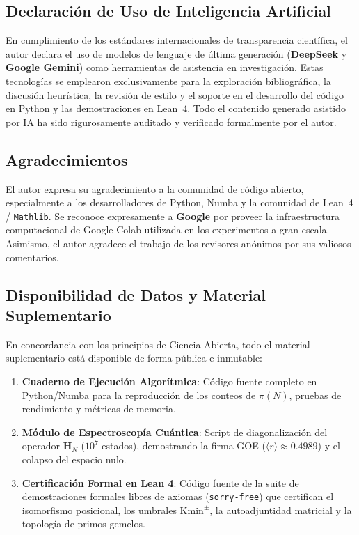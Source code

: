 \documentclass{article}
\numberwithin{equation}{section}
\theoremstyle{plain}
\theoremstyle{definition}
\begin{document}
\subsection*{Declaración de Uso de Inteligencia Artificial}
En cumplimiento de los estándares internacionales de transparencia científica, el autor declara el uso de modelos de lenguaje de última generación (\textbf{DeepSeek} y \textbf{Google Gemini}) como herramientas de asistencia en investigación. Estas tecnologías se emplearon exclusivamente para la exploración bibliográfica, la discusión heurística, la revisión de estilo y el soporte en el desarrollo del código en Python y las demostraciones en Lean~4. Todo el contenido generado asistido por IA ha sido rigurosamente auditado y verificado formalmente por el autor.

\subsection*{Agradecimientos}
El autor expresa su agradecimiento a la comunidad de código abierto, especialmente a los desarrolladores de Python, Numba y la comunidad de Lean~4 / \texttt{Mathlib}. Se reconoce expresamente a \textbf{Google} por proveer la infraestructura computacional de Google Colab utilizada en los experimentos a gran escala. Asimismo, el autor agradece el trabajo de los revisores anónimos por sus valiosos comentarios.

\subsection*{Disponibilidad de Datos y Material Suplementario}
\label{sec:disponibilidad}

En concordancia con los principios de Ciencia Abierta, todo el material suplementario está disponible de forma pública e inmutable:

\begin{enumerate}
    \item \textbf{Cuaderno de Ejecución Algorítmica}: Código fuente completo en Python/Numba para la reproducción de los conteos de $\pi(N)$, pruebas de rendimiento y métricas de memoria.
    \item \textbf{Módulo de Espectroscopía Cuántica}: Script de diagonalización del operador $\mathbf{H}_N$ ($10^7$ estados), demostrando la firma GOE ($\langle r \rangle \approx 0.4989$) y el colapso del espacio nulo.
    \item \textbf{Certificación Formal en Lean 4}: Código fuente de la suite de demostraciones formales libres de axiomas (\texttt{sorry-free}) que certifican el isomorfismo posicional, los umbrales $\mathrm{Kmin}^\pm$, la autoadjuntidad matricial y la topología de primos gemelos.
\end{enumerate}
\end{document}
